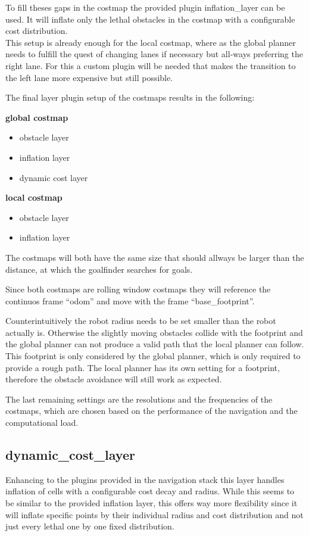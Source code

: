 To fill theses gaps in the costmap the provided plugin inflation\_layer can be used. It will inflate only the lethal obstacles in the costmap with a configurable cost distribution.\\

This setup is already enough for the local costmap, where as the global planner needs to fulfill the quest of changing lanes if necessary but all-ways preferring the right lane. For this a custom plugin will be needed that makes the transition to the left lane more expensive but still possible.


The final layer plugin setup of the costmaps results in the following:

\textbf{global costmap}
\begin{itemize}
	\item obstacle layer
	\item inflation layer
	\item dynamic cost layer
\end{itemize}

\textbf{local costmap}
\begin{itemize}
	\item obstacle layer
	\item inflation layer
\end{itemize}

The costmaps will both have the same size that should allways be larger than the distance, at which the goalfinder searches for goals.

Since both costmaps are rolling window costmaps they will reference the continuos frame ``odom'' and move with the frame ``base\_footprint''.

Counterintuitively the robot radius needs to be set smaller than the robot actually is. Otherwise the slightly moving obstacles collide with the footprint and the global planner can not produce a valid path that the local planner can follow.\\
This footprint is only considered by the global planner, which is only required to provide a rough path. The local planner has its own setting for a footprint, therefore the obstacle avoidance will still work as expected.

The last remaining settings are the resolutions and the frequencies of the costmaps, which are chosen based on the performance of the navigation and the computational load.


\subsection{dynamic\_cost\_layer}
Enhancing to the plugins provided in the navigation stack this layer handles inflation of cells with a configurable cost decay and radius. While this seems to be similar to the provided inflation layer, this offers way more flexibility since it will inflate specific points by their individual radius and cost distribution and not just every lethal one by one fixed distribution.\\

